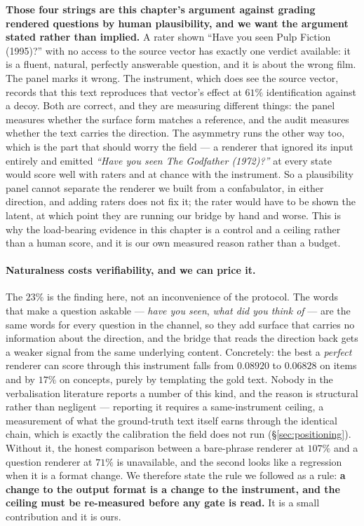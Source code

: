 \documentclass[11pt]{article}
\begin{document}
\textbf{Those four strings are this chapter's argument against grading rendered questions by human
plausibility, and we want the argument stated rather than implied.} A rater shown ``Have you seen
Pulp Fiction (1995)?'' with no access to the source vector has exactly one verdict available: it is
a fluent, natural, perfectly answerable question, and it is about the wrong film. The panel marks it
wrong. The instrument, which does see the source vector, records that this text reproduces that
vector's effect at $61\%$ identification against a decoy. Both are correct, and they are measuring
different things: the panel measures whether the surface form matches a reference, and the audit
measures whether the text carries the direction. The asymmetry runs the other way too, which is the
part that should worry the field --- a renderer that ignored its input entirely and emitted
\emph{``Have you seen The Godfather (1972)?''} at every state would score well with raters and at
chance with the instrument. So a plausibility panel cannot separate the renderer we built from a
confabulator, in either direction, and adding raters does not fix it; the rater would have to be
shown the latent, at which point they are running our bridge by hand and worse. This is why the
load-bearing evidence in this chapter is a control and a ceiling rather than a human score, and it
is our own measured reason rather than a budget.

\paragraph{Naturalness costs verifiability, and we can price it.} The $23\%$ is the finding here, not
an inconvenience of the protocol. The words that make a question askable --- \emph{have you seen},
\emph{what did you think of} --- are the same words for every question in the channel, so they add
surface that carries no information about the direction, and the bridge that reads the direction
back gets a weaker signal from the same underlying content. Concretely: the best a
\emph{perfect} renderer can score through this instrument falls from $0.08920$ to $0.06828$ on items
and by $17\%$ on concepts, purely by templating the gold text. Nobody in the verbalisation literature
reports a number of this kind, and the reason is structural rather than negligent --- reporting it
requires a same-instrument ceiling, a measurement of what the ground-truth text itself earns through
the identical chain, which is exactly the calibration the field does not run (\S\ref{sec:positioning}).
Without it, the honest comparison between a bare-phrase renderer at $107\%$ and a question renderer
at $71\%$ is unavailable, and the second looks like a regression when it is a format change. We
therefore state the rule we followed as a rule: \textbf{a change to the output format is a change to
the instrument, and the ceiling must be re-measured before any gate is read.} It is a small
contribution and it is ours.
\end{document}
